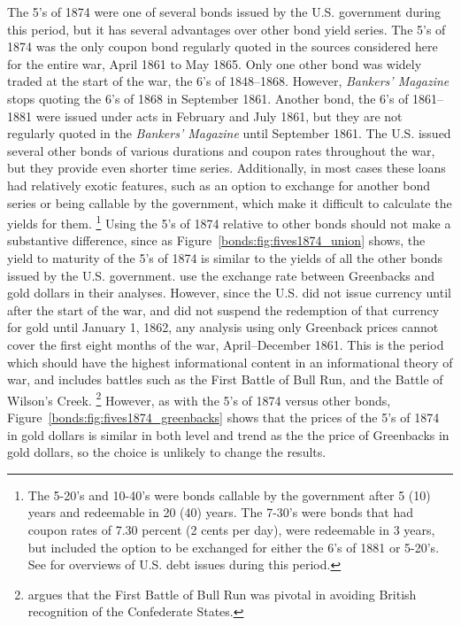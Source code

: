 The 5's of 1874 were one of several bonds issued by the U.S. government during this period, but it has several advantages over other bond yield series.
The 5's of 1874 was the only coupon bond regularly quoted in the sources considered here for the entire war, April 1861 to May 1865.
Only one other bond was widely traded at the start of the war, the 6's of 1848--1868.
However, \textit{Bankers' Magazine} stops quoting the 6's of 1868 in September 1861.
Another bond, the  6's of 1861--1881 were issued under acts in February and July 1861, but they are not regularly quoted in the \textit{Bankers' Magazine} until September 1861.
The U.S. issued several other bonds of various durations and coupon rates throughout the war, but they provide even shorter time series.
Additionally, in most cases these loans had relatively exotic features, such as an option to exchange for another bond series or being callable by the government, which make it difficult to calculate the yields for them.
\footnote{
  The 5-20's and 10-40's were bonds callable by the government after 5 (10) years and redeemable in 20 (40) years.
  The 7-30's were bonds that had coupon rates of 7.30 percent (2 cents per day), were redeemable in 3 years, but included the option to be exchanged for either the 6's of 1881 or 5-20's.
  See \textcites{Bayley1882}{DeKnight1900}[297--309]{HomerSylla2005} for overviews of U.S. debt issues during this period.
}
Using the 5's of 1874 relative to other bonds should not make a substantive difference, since as Figure~\ref{bonds:fig:fives1874_union} shows, the yield to maturity of the 5's of 1874 is similar to the yields of all the other bonds issued by the U.S. government.
\textcites{WillardGuinnaneEtAl1996}{McCandless1996}{SmithSmith1997} use the exchange rate between Greenbacks and gold dollars in their analyses.
However, since the U.S. did not issue currency until after the start of the war, and did not suspend the redemption of that currency for gold until January 1, 1862, any analysis using only Greenback prices cannot cover the first eight months of the war, April--December 1861.
This is the period which should have the highest informational content in an informational theory of war, and includes battles such as the First Battle of Bull Run, and the Battle of Wilson's Creek.%
\footnote{\textcite{Poast2012} argues that the First Battle of Bull Run was pivotal in avoiding British recognition of the Confederate States.}
However, as with the 5's of 1874 versus other bonds,  Figure~\ref{bonds:fig:fives1874_greenbacks} shows that the prices of the 5's of 1874 in gold dollars is similar in both level and trend as the the price of Greenbacks in gold dollars, so the choice is unlikely to change the results.

